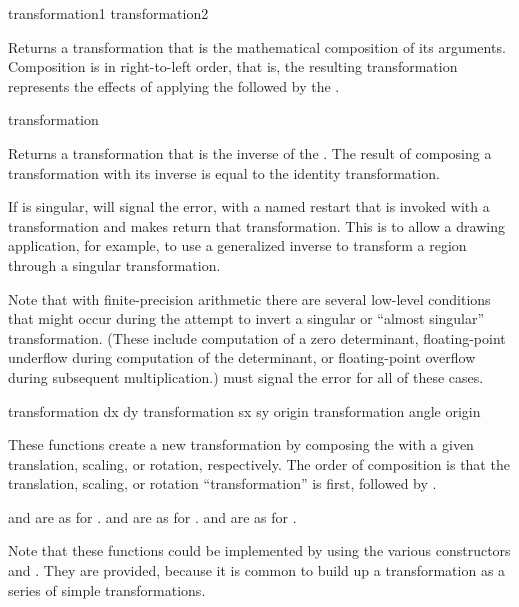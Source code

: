  {transformation1 transformation2}

Returns a transformation that is the mathematical composition of its arguments.
Composition is in right-to-left order, that is, the resulting transformation
represents the effects of applying the 
 followed by the 
.

 {transformation}

Returns a transformation that is the inverse of the 
.  The result of composing a transformation with its inverse
is equal to the identity transformation.

If  is singular,  will signal the
 error, with a named restart that is invoked with a
transformation and makes  return that transformation.
This is to allow a drawing application, for example, to use a generalized
inverse to transform a region through a singular transformation.

Note that with finite-precision arithmetic there are several low-level
conditions that might occur during the attempt to invert a singular or ``almost
singular'' transformation.  (These include computation of a zero determinant,
floating-point underflow during computation of the determinant, or
floating-point overflow during subsequent multiplication.)
 must signal the  error
for all of these cases.

 {transformation dx dy}
     {transformation sx sy \optional origin}
    {transformation angle \optional origin} 

These functions create a new transformation by composing the
  with a given translation, scaling, or
rotation, respectively.  The order of composition is that the translation,
scaling, or rotation ``transformation'' is first, followed by
.

 and  are as for .
 and  are as for .
 and  are as for .

Note that these functions could be implemented by using the various constructors
and .  They are provided, because it is common to
build up a transformation as a series of simple transformations.


